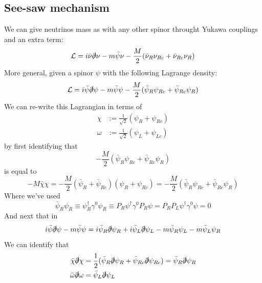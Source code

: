 \documentclass[11pt,a4paper,faculty=we,language=en,doctype=report]{cls/ugent-doc}
\begin{document}
\subsection{See-saw mechanism}
We can give neutrinos mass as with any other spinor throught Yukawa couplings and an extra term:
\begin{equation}
	\mathcal{L} = i\bar{\nu}\slashed{\partial}\nu - m\bar{\psi}\nu - \frac{M}{2} (\bar{\nu}_R\nu_{Rc} + \bar{\nu}_{Rc}\nu_R)
\end{equation}
More general, given a spinor $\psi$ with the following Lagrange density:
\begin{equation}
	\mathcal{L} = i\bar{\psi}\slashed{\partial}\psi - m\bar{\psi}\psi - \frac{M}{2} (\bar{\psi}_R\psi_{Rc} + \bar{\psi}_{Rc}\psi_R)
\end{equation}
We can re-write this Lagrangian in terms of
\begin{align}
	\chi &:= \frac{1}{\sqrt{2}} (\psi_R + \psi_{Rc})\\
	\omega &:= \frac{1}{\sqrt{2}} (\psi_L + \psi_{Lc})
\end{align}
by first identifying that
\begin{equation}
	- \frac{M}{2} (\bar{\psi}_R\psi_{Rc} + \bar{\psi}_{Rc}\psi_R)
\end{equation}
is equal to
\begin{equation}
	-M\bar{\chi} \chi = -\frac{M}{2} (\bar{\psi}_R + \bar{\psi}_{Rc}) (\psi_R + \psi_{Rc}) = -\frac{M}{2} (\bar{\psi}_R\psi_{Rc} + \bar{\psi}_{Rc}\psi_R)
\end{equation}
Where we've used
\begin{equation}
	\bar{\psi}_R\psi_{R} \equiv \psi_R^\dagger\gamma^0\psi_{R} \equiv P_R\psi^\dagger\gamma^0P_R\psi = P_RP_L\psi^\dagger\gamma^0\psi = 0
\end{equation}
And next that in
\begin{equation}
	i\bar{\psi}\slashed{\partial}\psi - m\bar{\psi}\psi = i\bar{\psi}_R\slashed{\partial}\psi_{R} + i\bar{\psi}_L\slashed{\partial}\psi_{L} - m\bar{\psi}_R\psi_{L} - m\bar{\psi}_L\psi_{R}
\end{equation}
We can identify that
\begin{align}
	\bar{\chi}\slashed{\partial}\chi &= \frac{1}{2}(\bar{\psi}_R\slashed{\partial}\psi_{R} + \bar{\psi}_{Rc}\slashed{\partial}\psi_{Rc}) = \bar{\psi}_R \slashed{\partial} \psi_{R}\\
	\bar{\omega}\slashed{\partial}\omega &= \bar{\psi}_L \slashed{\partial} \psi_{L}
\end{align}
\end{document}
